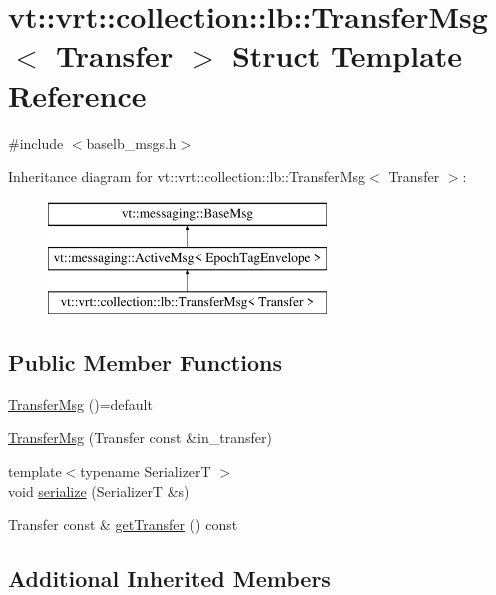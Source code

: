 \hypertarget{structvt_1_1vrt_1_1collection_1_1lb_1_1_transfer_msg}{}\section{vt\+:\+:vrt\+:\+:collection\+:\+:lb\+:\+:Transfer\+Msg$<$ Transfer $>$ Struct Template Reference}
\label{structvt_1_1vrt_1_1collection_1_1lb_1_1_transfer_msg}


{\ttfamily \#include $<$baselb\+\_\+msgs.\+h$>$}

Inheritance diagram for vt\+:\+:vrt\+:\+:collection\+:\+:lb\+:\+:Transfer\+Msg$<$ Transfer $>$\+:\begin{figure}[H]
\begin{center}
\leavevmode
\includegraphics[height=3.000000cm]{structvt_1_1vrt_1_1collection_1_1lb_1_1_transfer_msg}
\end{center}
\end{figure}
\subsection*{Public Member Functions}
\begin{DoxyCompactItemize}
\item 
\hyperlink{structvt_1_1vrt_1_1collection_1_1lb_1_1_transfer_msg_ad94fef4d81e901de07019aa41718c516}{Transfer\+Msg} ()=default
\item 
\hyperlink{structvt_1_1vrt_1_1collection_1_1lb_1_1_transfer_msg_a3f2753a92fc1d0fa93489b9adf102533}{Transfer\+Msg} (Transfer const \&in\+\_\+transfer)
\item 
{\footnotesize template$<$typename SerializerT $>$ }\\void \hyperlink{structvt_1_1vrt_1_1collection_1_1lb_1_1_transfer_msg_a230421d821c61d152b596b6c024010fd}{serialize} (SerializerT \&s)
\item 
Transfer const  \& \hyperlink{structvt_1_1vrt_1_1collection_1_1lb_1_1_transfer_msg_a9c93bf7d69be7e2bff65999cc4fadf98}{get\+Transfer} () const
\end{DoxyCompactItemize}
\subsection*{Additional Inherited Members}


